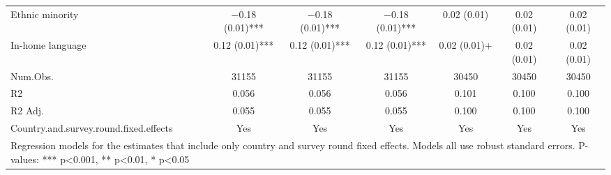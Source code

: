 \begin{table}
\begin{tabular}[t]{lcccccc}
Ethnic minority & \num{-0.18} (\num{0.01})*** & \num{-0.18} (\num{0.01})*** & \num{-0.18} (\num{0.01})*** & \num{0.02} (\num{0.01}) & \num{0.02} (\num{0.01}) & \num{0.02} (\num{0.01})\\
In-home language & \num{0.12} (\num{0.01})*** & \num{0.12} (\num{0.01})*** & \num{0.12} (\num{0.01})*** & \num{0.02} (\num{0.01})+ & \num{0.02} (\num{0.01}) & \num{0.02} (\num{0.01})\\
\midrule
Num.Obs. & \num{31155} & \num{31155} & \num{31155} & \num{30450} & \num{30450} & \num{30450}\\
R2 & \num{0.056} & \num{0.056} & \num{0.056} & \num{0.101} & \num{0.100} & \num{0.100}\\
R2 Adj. & \num{0.055} & \num{0.055} & \num{0.055} & \num{0.100} & \num{0.100} & \num{0.100}\\
Country.and.survey.round.fixed.effects & Yes & Yes & Yes & Yes & Yes & Yes\\
\bottomrule
\multicolumn{7}{l}{\rule{0pt}{1em}Regression models for the estimates that include only country and survey round fixed effects. Models all use robust standard errors. P-values: *** p<0.001, ** p<0.01, * p<0.05}\\
\end{tabular}
\end{table}
